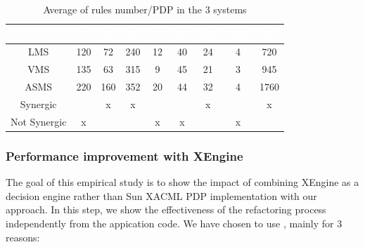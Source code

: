 \begin{table}[h!]
\centering
\begin{tabular}{|>{\tiny}c|>{\tiny}c|>{\tiny}c|>{\tiny}c|>{\tiny}c|>{\tiny}c|>{\tiny}c|>{\tiny}c|>{\tiny}c|}   
\hline  \rowcolor{black} \scriptsize \bf \textcolor {white}{}
& \scriptsize \bf \textcolor {white}{S}
& \scriptsize \bf \textcolor {white}{A}
& \scriptsize \bf \textcolor  {white}{R}
& \scriptsize \bf \textcolor  {white}{SA}
& \scriptsize \bf \textcolor  {white}{SR}
& \scriptsize \bf \textcolor  {white}{AR} 
& \scriptsize \bf \textcolor  {white}{SAR}
& \scriptsize \bf \textcolor {white}{IA}\\ \hline


\scriptsize  {LMS}
&\scriptsize  {120}
& \scriptsize {72}
& \scriptsize {240}
& \scriptsize {12}
& \scriptsize {40}
& \scriptsize {24}
& \scriptsize {4}
& \scriptsize {720}
  \\ \hline


\scriptsize  {VMS}
&\scriptsize  {135}
& \scriptsize {63}
& \scriptsize {315}
& \scriptsize {9}
& \scriptsize {45}
& \scriptsize {21}
& \scriptsize {3}
& \scriptsize {945}
  \\ \hline
\scriptsize  {ASMS}
&\scriptsize  {220}
& \scriptsize {160}
& \scriptsize {352}
& \scriptsize {20}
& \scriptsize {44}
& \scriptsize {32}
& \scriptsize {4}
& \scriptsize {1760}
  \\ \hline
\scriptsize  {Synergic}
&\scriptsize  {}
& \scriptsize {x}
& \scriptsize {x}
& \scriptsize {}
& \scriptsize {}
& \scriptsize {x}
& \scriptsize {}
& \scriptsize {x}
  \\ \hline

\scriptsize  {Not Synergic}
&\scriptsize  {x}
& \scriptsize {}
& \scriptsize {}
& \scriptsize {x}
& \scriptsize {x}
& \scriptsize {}
& \scriptsize {x}
& \scriptsize {}
  \\ \hline
\end{tabular}
\caption{Average of rules number/PDP in the 3 systems}\end{table}

\subsubsection{Performance improvement with XEngine}
The goal of this empirical study is to show the impact of combining XEngine as a decision engine rather than Sun XACML PDP implementation with our approach. 
In this step, we show the effectiveness of the refactoring process independently from the appication code.
We have chosen to use \cite{Xengine}, mainly for 3 reasons:

